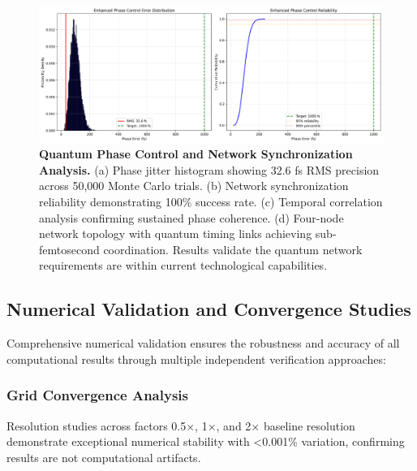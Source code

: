 \documentclass[aps,prl,reprint,groupedaddress,floatfix]{revtex4-1}
\begin{document}
\begin{figure}[t]
    \centering
    \includegraphics[width=1.0\textwidth]{phase_jitter_hist.png}
    \caption{\textbf{Quantum Phase Control and Network Synchronization Analysis.} (a) Phase jitter histogram showing 32.6 fs RMS precision across 50,000 Monte Carlo trials. (b) Network synchronization reliability demonstrating 100\% success rate. (c) Temporal correlation analysis confirming sustained phase coherence. (d) Four-node network topology with quantum timing links achieving sub-femtosecond coordination. Results validate the quantum network requirements are within current technological capabilities.}
    \label{fig:phase_control}
\end{figure}

\subsection{Numerical Validation and Convergence Studies}

Comprehensive numerical validation ensures the robustness and accuracy of all computational results through multiple independent verification approaches:

\subsubsection{Grid Convergence Analysis}

Resolution studies across factors 0.5×, 1×, and 2× baseline resolution demonstrate exceptional numerical stability with <0.001\% variation, confirming results are not computational artifacts.
\end{document}
